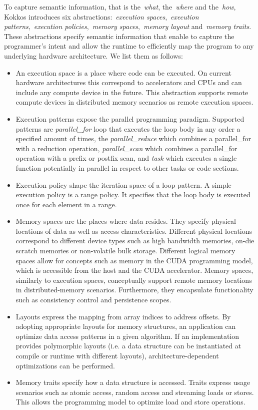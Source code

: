 To capture semantic information, that is the~\emph{what}, the~\emph{where} and the~\emph{how}, Kokkos introduces six abstractions:~\emph{execution spaces},~\emph{execution patterns},~\emph{execution policies},~\emph{memory spaces},~\emph{memory layout} and~\emph{memory traits}. These abstractions specify semantic information that enable to capture the programmer's intent and allow the runtime to efficiently map the program to any underlying hardware architecture. We list them as follows:
\begin{itemize}
	\item  An execution space is a place where code can be executed. On current hardware architectures this correspond to accelerators and CPUs and can include any compute device in the future. This abstraction supports remote compute devices in distributed memory scenarios as remote execution spaces.
	\item Execution patterns expose the parallel programming paradigm. Supported patterns are \emph{parallel\_for} loop that executes the loop body in any order a specified amount of times, the \emph{parallel\_reduce} which combines a parallel\_for with a reduction operation, \emph{parallel\_scan} which combines a parallel\_for operation with a prefix or postfix scan, and \emph{task} which executes a single function potentially in parallel in respect to other tasks or code sections. 
	\item Execution policy shape the iteration space of a loop pattern. A simple execution policy is a range policy. It specifies that the loop body is executed once for each element in a range.
	\item Memory spaces are the places where data resides. They specify physical locations of data as well as access characteristics. Different physical locations correspond to different device types such as high bandwidth memories, on-die scratch memories or non-volatile bulk storage. Different logical memory spaces allow for concepts such as memory in the CUDA programming model, which is accessible from the host and the CUDA accelerator. Memory spaces, similarly to execution spaces, conceptually support remote memory locations in distributed-memory scenarios. Furthermore, they encapsulate functionality such as consistency control and persistence scopes.
	\item Layouts express the mapping from array indices to address offsets. By adopting appropriate layouts for memory structures, an application can optimize data access patterns in a given algorithm. If an implementation provides polymorphic layouts (i.e. a data structure can be instantiated at compile or runtime with different layouts), architecture-dependent optimizations can be performed.
	\item Memory traits specify how a data structure is accessed. Traits express usage scenarios such as atomic access, random access and streaming loads or stores. This allows the programming model to  optimize load and store operations.
\end{itemize}

